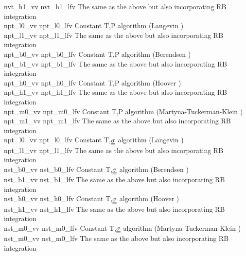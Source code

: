 \begin{tabbing}
{\sc nvt\_h1\_vv} \> {\sc nvt\_h1\_lfv} \> The same as the above but also incorporating RB integration \\
{\sc npt\_l0\_vv} \> {\sc npt\_l0\_lfv} \> Constant T,P algorithm (Langevin \cite{quigley-04}) \\
{\sc npt\_l1\_vv} \> {\sc npt\_l1\_lfv} \> The same as the above but also incorporating RB integration \\
{\sc npt\_b0\_vv} \> {\sc npt\_b0\_lfv} \> Constant T,P algorithm (Berendsen \cite{berendsen-84a}) \\
{\sc npt\_b1\_vv} \> {\sc npt\_b1\_lfv} \> The same as the above but also incorporating RB integration \\
{\sc npt\_h0\_vv} \> {\sc npt\_h0\_lfv} \> Constant T,P algorithm (Hoover \cite{hoover-85a}) \\
{\sc npt\_h1\_vv} \> {\sc npt\_h1\_lfv} \> The same as the above but also incorporating RB integration \\
{\sc npt\_m0\_vv} \> {\sc npt\_m0\_lfv} \> Constant T,P algorithm (Martyna-Tuckerman-Klein \cite{martyna-96a}) \\
{\sc npt\_m1\_vv} \> {\sc npt\_m1\_lfv} \> The same as the above but also incorporating RB integration \\
{\sc npt\_l0\_vv} \> {\sc npt\_l0\_lfv} \> Constant T,$\mbox{$\underline{\underline{\bf \sigma}}$}$ algorithm (Langevin \cite{quigley-04}) \\
{\sc npt\_l1\_vv} \> {\sc npt\_l1\_lfv} \> The same as the above but also incorporating RB integration \\
{\sc nst\_b0\_vv} \> {\sc nst\_b0\_lfv} \> Constant T,$\mbox{$\underline{\underline{\bf \sigma}}$}$ algorithm (Berendsen \cite{berendsen-84a}) \\
{\sc nst\_b1\_vv} \> {\sc nst\_b1\_lfv} \> The same as the above but also incorporating RB integration \\
{\sc nst\_h0\_vv} \> {\sc nst\_h0\_lfv} \> Constant T,$\mbox{$\underline{\underline{\bf \sigma}}$}$ algorithm (Hoover \cite{hoover-85a}) \\
{\sc nst\_h1\_vv} \> {\sc nst\_h1\_lfv} \> The same as the above but also incorporating RB integration \\
{\sc nst\_m0\_vv} \> {\sc nst\_m0\_lfv} \> Constant T,$\mbox{$\underline{\underline{\bf \sigma}}$}$ algorithm (Martyna-Tuckerman-Klein \cite{martyna-96a}) \\
{\sc nst\_m0\_vv} \> {\sc nst\_m0\_lfv} \> The same as the above but also incorporating RB integration \\
\end{tabbing}

